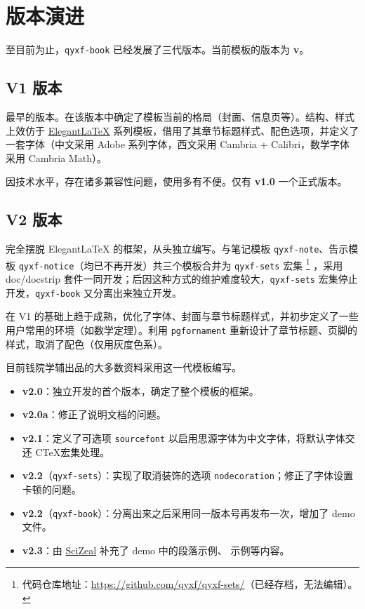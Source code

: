 \documentclass[
  10pt,
  twoside,
  openany,
  b5paper, %
  colorscheme = basic %
]{qyxf-book}
\begin{document}
\section{版本演进}

至目前为止，\verb|qyxf-book| 已经发展了三代版本。当前模板的版本为 \textbf{v\styversion}。

\subsection{V1 版本}
最早的版本。在该版本中确定了模板当前的格局（封面、信息页等）。结构、样式上效仿于 \href{https://elegantlatex.org/}{Elegant\LaTeX} 系列模板，借用了其章节标题样式、配色选项，并定义了一套字体（中文采用 Adobe 系列字体，西文采用 Cambria + Calibri，数学字体采用 Cambria Math）。

因技术水平，存在诸多兼容性问题，使用多有不便。仅有 \textbf{v1.0} 一个正式版本。

\subsection{V2 版本}

完全摆脱 Elegant\LaTeX{} 的框架，从头独立编写。与笔记模板 \verb|qyxf-note|、告示模板 \verb|qyxf-notice|（均已不再开发）共三个模板合并为 \verb|qyxf-sets| 宏集
\footnote{代码仓库地址：\url{https://github.com/qyxf/qyxf-sets/}（已经存档，无法编辑）。}
，采用 doc/docstrip 套件一同开发；后因这种方式的维护难度较大，\verb|qyxf-sets| 宏集停止开发，\verb|qyxf-book| 又分离出来独立开发。

在 V1 的基础上趋于成熟，优化了字体、封面与章节标题样式，并初步定义了一些用户常用的环境（如数学定理）。利用 \verb|pgfornament| 重新设计了章节标题、页脚的样式，取消了配色（仅用灰度色系）。

目前钱院学辅出品的大多数资料采用这一代模板编写。

\begin{itemize}
  \item \textbf{v2.0}：独立开发的首个版本，确定了整个模板的框架。
  \item \textbf{v2.0a}：修正了说明文档的问题。
  \item \textbf{v2.1}：定义了可选项 \verb|sourcefont| 以启用思源字体为中文字体，将默认字体交还 C\TeX 宏集处理。
  \item \textbf{v2.2}（\verb|qyxf-sets|）：实现了取消装饰的选项 \verb|nodecoration|；修正了字体设置卡顿的问题。
  \item \textbf{v2.2}（\verb|qyxf-book|）：分离出来之后采用同一版本号再发布一次，增加了 demo 文件。
  \item \textbf{v2.3}：由 \href{https://github.com/SciZeal}{SciZeal} 补充了 demo 中的段落示例、 示例等内容。
\end{itemize}
\end{document}
